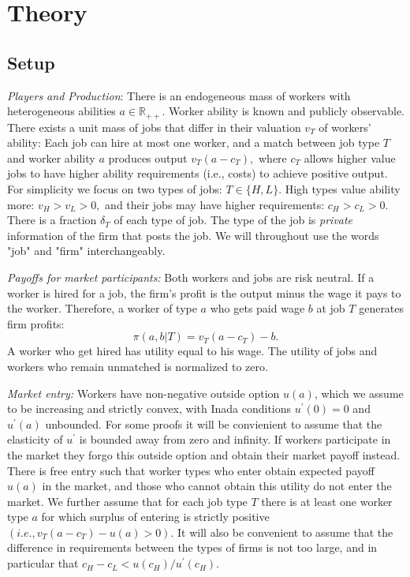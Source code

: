 \documentclass[12pt]{article}
\theoremstyle{plain}
\begin{document}
 

\section{Theory}

\subsection{\textbf{Setup}}

\textit{Players and Production}: There is an endogeneous mass of workers
with heterogeneous abilities $a\in \mathbb{R}_{++}.$ Worker ability is known
and publicly observable. There exists a unit mass of jobs that differ in
their valuation $v_{T}$ of workers' ability: Each job can hire at most one
worker, and a match between job type $T$ and worker ability $a$ produces
output $v_{T}(a-c_{T}),$ where $c_{T}$ allows higher value jobs to have
higher ability requirements (i.e., costs) to achieve positive output. For
simplicity we focus on two types of jobs: $T\in \{H,L\}.$ High types value
ability more: $v_{H}>v_{L}>0,$ and their jobs may have higher requirements: $%
c_{H}>c_{L}>0$. There is a fraction $\delta _{T}$ of each type of job. The
type of the job is \textit{private} information of the firm that posts the
job. We will throughout use the words "job" and "firm" interchangeably.

\textit{Payoffs for market participants:} Both workers and jobs are risk
neutral. If a worker is hired for a job, the firm's profit is the output
minus the wage it pays to the worker. Therefore, a worker of type $a$ who
gets paid wage $b$ at job $T$ generates firm profits:%
\begin{equation}
\pi (a,b|T)=v_{T}(a-c_{T})-b.  \label{firm-profit}
\end{equation}%
A worker who get hired has utility equal to his wage. The utility of jobs
and workers who remain unmatched is normalized to zero.

\textit{Market entry:} Workers have non-negative outside option $u(a)$,
which we assume to be increasing and strictly convex, with Inada conditions $%
u^{\prime }(0)=0$ and $u^{\prime }(a)$ unbounded. For some proofs it will be
convienient to assume that the elasticity of $u^{\prime }$ is bounded away
from zero and infinity. If workers participate in the market they forgo this
outside option and obtain their market payoff instead. There is free entry
such that worker types who enter obtain expected payoff $u(a)$ in the
market, and those who cannot obtain this utility do not enter the market. We
further assume that for each job type $T$ there is at least one worker type $%
a$ for which surplus of entering is strictly positive $%
(i.e.,v_{T}(a-c_{T})-u\left( a\right) >0).$ It will also be convenient to
assume that the difference in requirements between the types of firms is not
too large, and in particular that $c_{H}-c_{L}<u(c_{H})/u^{\prime }(c_{H}).$
\end{document}
